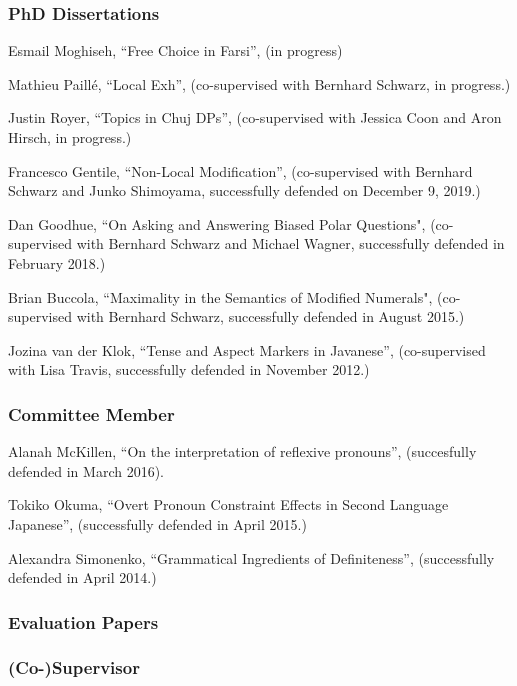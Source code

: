 \documentclass[11pt]{article}
\begin{document}
\subsubsection*{PhD Dissertations}


Esmail Moghiseh, ``Free Choice in Farsi'', (in progress)

Mathieu Paill\'e, ``Local Exh'', (co-supervised with Bernhard Schwarz, in progress.)

Justin Royer, ``Topics in Chuj DPs'', (co-supervised with Jessica Coon and Aron Hirsch, in progress.)


Francesco Gentile, ``Non-Local Modification'', (co-supervised with Bernhard Schwarz and Junko Shimoyama, successfully defended on December 9, 2019.)

Dan Goodhue, ``On Asking and Answering Biased Polar Questions", (co-supervised with Bernhard Schwarz and Michael Wagner, successfully defended in February 2018.)

Brian Buccola, ``Maximality in the Semantics of Modified Numerals", (co-supervised with Bernhard Schwarz, successfully defended in August 2015.)

Jozina van der Klok, ``Tense and Aspect Markers in Javanese'',
(co-supervised with Lisa Travis, successfully defended in November
2012.)

\vspace{-10pt}

\subsubsection*{Committee Member}

Alanah McKillen, ``On the interpretation of reflexive pronouns'', (succesfully defended in March 2016).

Tokiko Okuma, ``Overt Pronoun Constraint Effects in Second Language Japanese'', (successfully defended in April 2015.)

Alexandra Simonenko, ``Grammatical Ingredients of Definiteness'',
(successfully defended in April 2014.)
\vspace{-10pt}


\subsubsection*{Evaluation Papers}

\subsubsection*{(Co-)Supervisor}
\end{document}
